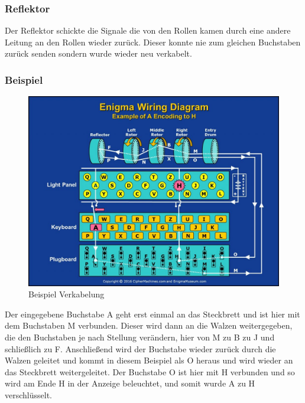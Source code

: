 \subsubsection{Reflektor}
Der Reflektor schickte die Signale die von den Rollen kamen durch eine andere Leitung an den Rollen wieder zurück. Dieser konnte nie zum gleichen Buchstaben zurück senden sondern wurde wieder neu verkabelt.

\subsubsection{Beispiel}

\begin{figure}[H]
\centering
\includegraphics[scale=0.3]{Enigma_Maschine_Beispiel.jpg}
\caption{Beispiel Verkabelung}
\label{fig:enigma}
\end{figure}

Der eingegebene Buchstabe A geht erst einmal an das Steckbrett und ist hier mit dem Buchstaben M verbunden. Dieser wird dann an die Walzen weitergegeben, die den Buchstaben je nach Stellung verändern, hier von M zu B zu J und schließlich zu F. Anschließend wird der Buchstabe wieder zurück durch die Walzen geleitet und kommt in diesem Beispiel als O heraus und wird wieder an das Steckbrett weitergeleitet. Der Buchstabe O ist hier mit H verbunden und so wird am Ende H in der Anzeige beleuchtet, und somit wurde A zu H verschlüsselt.

